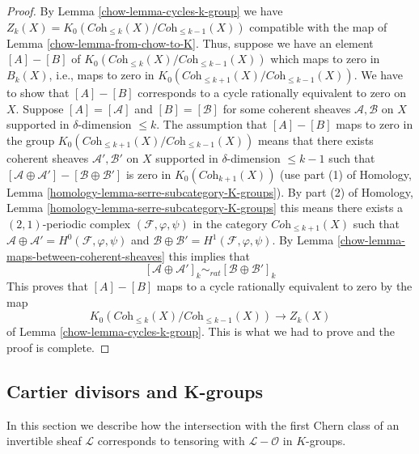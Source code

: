 \begin{proof}

By Lemma \ref{chow-lemma-cycles-k-group} we have
$Z_k(X) = K_0(\textit{Coh}_{\leq k}(X)/\textit{Coh}_{\leq k - 1}(X))$
compatible with the map of Lemma \ref{chow-lemma-from-chow-to-K}.
Thus, suppose we have an element $[A] - [B]$ of
$K_0(\textit{Coh}_{\leq k}(X)/\textit{Coh}_{\leq k - 1}(X))$
which maps to zero in $B_k(X)$, i.e., maps to zero in
$K_0(\textit{Coh}_{\leq k + 1}(X)/\textit{Coh}_{\leq k - 1}(X))$.
We have to show that $[A] - [B]$ corresponds to a cycle
rationally equivalent to zero on $X$.
Suppose $[A] = [\mathcal{A}]$ and $[B] = [\mathcal{B}]$
for some coherent sheaves $\mathcal{A}, \mathcal{B}$ on
$X$ supported in $\delta$-dimension $\leq k$.
The assumption that $[A] - [B]$ maps to zero in the group
$K_0(\textit{Coh}_{\leq k + 1}(X)/\textit{Coh}_{\leq k - 1}(X))$
means that there exists coherent sheaves
$\mathcal{A}', \mathcal{B}'$ on $X$ supported in
$\delta$-dimension $\leq k - 1$ such that
$[\mathcal{A} \oplus \mathcal{A}'] - [\mathcal{B} \oplus \mathcal{B}']$
is zero in $K_0(\textit{Coh}_{k + 1}(X))$ (use part (1) of
Homology, Lemma \ref{homology-lemma-serre-subcategory-K-groups}).
By part (2) of
Homology, Lemma \ref{homology-lemma-serre-subcategory-K-groups}
this means there exists a $(2, 1)$-periodic complex
$(\mathcal{F}, \varphi, \psi)$ in the category $\textit{Coh}_{\leq k + 1}(X)$
such that
$\mathcal{A} \oplus \mathcal{A}' = H^0(\mathcal{F}, \varphi, \psi)$
and $\mathcal{B} \oplus \mathcal{B}' = H^1(\mathcal{F}, \varphi, \psi)$.
By Lemma \ref{chow-lemma-maps-between-coherent-sheaves}
this implies that
$$
[\mathcal{A} \oplus \mathcal{A}']_k
\sim_{rat}
[\mathcal{B} \oplus \mathcal{B}']_k
$$
This proves that $[A] - [B]$ maps to a cycle rationally
equivalent to zero by the map
$$
K_0(\textit{Coh}_{\leq k}(X)/\textit{Coh}_{\leq k - 1}(X))
\longrightarrow Z_k(X)
$$
of Lemma \ref{chow-lemma-cycles-k-group}. This is what we
had to prove and the proof is complete.
\end{proof}


\subsection{Cartier divisors and K-groups}
\label{chow-subsection-cartier-coherent}

In this section we describe how the intersection with the
first Chern class of an invertible sheaf $\mathcal{L}$
corresponds to tensoring with $\mathcal{L} - \mathcal{O}$
in $K$-groups.

